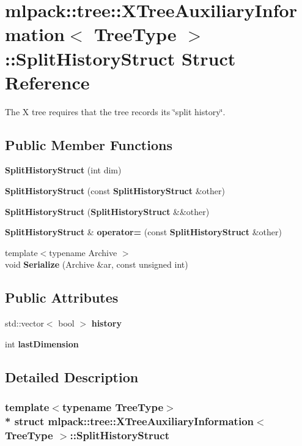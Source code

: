 \section{mlpack\+:\+:tree\+:\+:X\+Tree\+Auxiliary\+Information$<$ Tree\+Type $>$\+:\+:Split\+History\+Struct Struct Reference}
\label{structmlpack_1_1tree_1_1XTreeAuxiliaryInformation_1_1SplitHistoryStruct}


The X tree requires that the tree records it\textquotesingle{}s \char`\"{}split history\char`\"{}.  


\subsection*{Public Member Functions}
\begin{DoxyCompactItemize}
\item 
{\bf Split\+History\+Struct} (int dim)
\item 
{\bf Split\+History\+Struct} (const {\bf Split\+History\+Struct} \&other)
\item 
{\bf Split\+History\+Struct} ({\bf Split\+History\+Struct} \&\&other)
\item 
{\bf Split\+History\+Struct} \& {\bf operator=} (const {\bf Split\+History\+Struct} \&other)
\item 
{\footnotesize template$<$typename Archive $>$ }\\void {\bf Serialize} (Archive \&ar, const unsigned int)
\end{DoxyCompactItemize}
\subsection*{Public Attributes}
\begin{DoxyCompactItemize}
\item 
std\+::vector$<$ bool $>$ {\bf history}
\item 
int {\bf last\+Dimension}
\end{DoxyCompactItemize}


\subsection{Detailed Description}
\subsubsection*{template$<$typename Tree\+Type$>$\\*
struct mlpack\+::tree\+::\+X\+Tree\+Auxiliary\+Information$<$ Tree\+Type $>$\+::\+Split\+History\+Struct}

